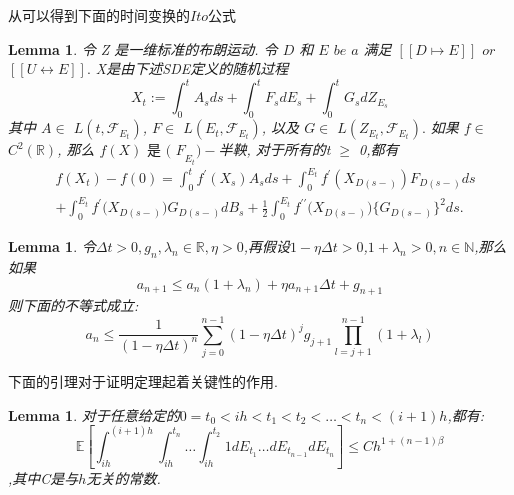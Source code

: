 \documentclass[12pt,final]{article}
\numberwithin{equation}{section}
\numberwithin{figure}{section}
\numberwithin{table}{section}
\theoremstyle{plain}
\newtheorem{lemma}[theorem]{Lemma}      %
\theoremstyle{definition}
\theoremstyle{remark}
\begin{document}
	从\cite{umarov2018beyond}可以得到下面的时间变换的$Ito$公式
	\begin{lemma}\label{ito}
		令 Z 是一维标准的布朗运动. 令 $D$ 和 $E$ $be$ $a$ 满足 $[ [ D\longmapsto E] ]$ $or$ $[ [ U\longleftrightarrow E] ] .$ X是由下述SDE定义的随机过程
		$$X_t:=\int_0^tA_sds+\int_0^tF_sdE_s+\int_0^tG_sdZ_{E_s}$$
		其中 $A\in$ $L( t, \mathcal{F} _{E_t})$, $F\in$ $L( E_t, \mathcal{F} _{E_t})$, 以及 $G\in$ $L( Z_{E_t}, \mathcal{F} _{E_t}) .$ 如果 $f\in$ $C^2( \mathbb{R} )$, 那么
		$f( X) \textit{ 是 ( F}_{E_t}) - $半鞅, 对于所有的t $\ge$ 0,都有
		$$\begin{aligned}
			&f(X_{t})-f(0)=\int_{0}^{t}f^{\prime}(X_{s})A_{s}ds+\int_{0}^{E_{t}}f^{\prime}\left(X_{D(s-)}\right)F_{D(s-)}ds\\
			&+\int_{0}^{E_{t}}f^{\prime}\big(X_{D(s-)}\big)G_{D(s-)}dB_{s}+\frac{1}{2}\int_{0}^{E_{t}}f^{\prime\prime}\big(X_{D(s-)}\big)\big\{G_{D(s-)}\big\}^{2}ds.
		\end{aligned}$$
	\end{lemma}
	\begin{lemma}\label{lemma:1}
		令$\Delta t > 0,g_n,\lambda _n \in \mathbb{R},\eta > 0$,再假设$1-\eta \Delta t > 0$,$1 + \lambda _n > 0,n \in \mathbb{N}$,那么如果
		\begin{equation*}
			a_{n+1} \leq a_n(1+\lambda _n)+\eta a_{n+1}\Delta t +g_{n+1}
		\end{equation*}
		则下面的不等式成立:
		\begin{equation}
			a_n \leq \frac{1}{(1-\eta\Delta t)^n}\sum\limits_{j=0}^{n-1}(1-\eta\Delta t)^jg_{j+1}\prod\limits_{l=j+1}^{n-1}(1+\lambda _l)
		\end{equation}
	\end{lemma}
	下面的引理对于证明定理起着关键性的作用.
	\begin{lemma}\label{lemma:2}
		对于任意给定的$0 = t_0 < ih < t_1 < t_2 < \ldots <t_n <(i+1)h$,都有:
		\begin{equation}
			\mathbb{E}\left[\int_{ih}^{(i+1)h}
			\int_{ih}^{t_n} \ldots \int_{ih}^{t_2} 1 dE_{t_1} \ldots dE_{t_{n-1}}dE_{t_n}\right] \le Ch^{1+(n-1)\beta}
		\end{equation}
		,其中C是与$h$无关的常数.
	\end{lemma}
	
\end{document}
